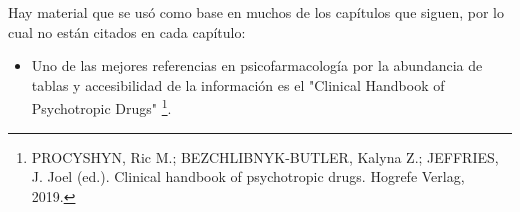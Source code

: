 \documentclass[encares.tex]{subfiles}
\begin{document}
Hay material que se usó como base en muchos de los capítulos que siguen, por lo cual no están citados en cada capítulo:
\begin{itemize}
\item Uno de las mejores referencias en psicofarmacología por la abundancia de tablas y accesibilidad de la información es el "Clinical Handbook of Psychotropic Drugs" \footnote{PROCYSHYN, Ric M.; BEZCHLIBNYK-BUTLER, Kalyna Z.; JEFFRIES, J. Joel (ed.). Clinical handbook of psychotropic drugs. Hogrefe Verlag, 2019.}.
\end{itemize}
\end{document}
